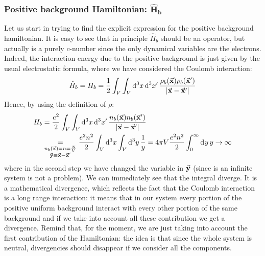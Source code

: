 \documentclass[../main/main.tex]{subfiles}
\begin{document}
\subsubsection{Positive background Hamiltonian: \( \mathbf{\hat{H}_b } \) }
Let us start in trying to find the explicit expression for the positive background hamiltonian. It is easy to see that in principle \( \hat{H}_b \) should be an operator, but actually is a purely \( c \)-number since the only dynamical variables are the electrons. Indeed, the interaction energy due to the positive background is just given by the usual electrostatic formula, where we have considered the Coulomb interaction:
\begin{equation*}
  \hat{H}_b = H_b = \frac{1}{2} \int_{V}^{} \int_{V}^{} \dd[3]{x}  \dd[3]{x'} \frac{\rho _b (\va{x}) \rho _b (\va{x}')}{\abs{\va{x}-\va{x}'} }
\end{equation*}
Hence, by using the definition of \( \rho  \):
\begin{equation*}
\begin{split}
  H_b &= \frac{e^2}{2} \int_{V}^{} \int_{V}^{} \dd[3]{x}  \dd[3]{x'}
  \frac{n_b (\va{x}) n_b (\va{x}')}{\abs{\va{x}-\va{x}'} } \\
  & \underset{\substack{n_b (\va{x}) = n = \frac{N}{V} \\ \va{y} \equiv \va{x}-\va{x}' } }{=}  \frac{e^2 n^2}{2}  \int_{V}^{} \dd[3]{x}  \int_{V}^{}  \dd[3]{y}  \frac{1}{y}
  =4 \pi V \frac{e^2 n^2}{2} \int_{0}^{\infty } \dd[]{y} y \rightarrow \infty
\end{split}
\end{equation*}
where in the second step we have changed the variable in \( \va{y} \) (since is an infinite system is not a problem).
We can immediately see that the integral diverge. It is a mathematical divergence, which reflects the fact that the Coulomb interaction is a long range interaction: it means that in our system every portion of the positive uniform background interact with every other portion of the same background and if we take into account all these contribution we get a divergence.
Remind that, for the moment, we are just taking into account the first contribution of the Hamiltonian: the idea is that since the whole system is neutral, divergencies should disappear if we consider all the components.
\end{document}
